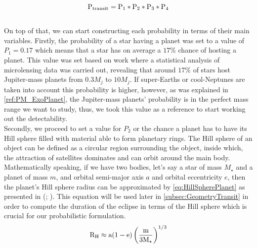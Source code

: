 \begingroup
\Large
\begin{equation}
 \textnormal{P}_{\textnormal{transit}} = \textnormal{P}_1 * \textnormal{P}_2 * \textnormal{P}_3 * \textnormal{P}_4
 \label{eq:Probabilities}
\end{equation}
\endgroup\\

On top of that, we can start constructing each probability in terms of their main variables. Firstly, the probability of a star having a planet was set to a value of $P_1 = 0.17$ which means that a star has on average a $17\%$ chance of hosting a planet. This value was set based on \citeyear{2012Natur.481..167C} work where a statistical analysis of microlensing data was carried out, revealing that around $17\%$ of stars host Jupiter-mass planets from $0.3M_j$ to $10M_j$. If super-Earths or cool-Neptunes are taken into account this probability is higher, however, as was explained in \autoref{ref:PM_ExoPlanet}, the Jupiter-mass planets' probability is in the perfect mass range we want to study, thus, we took this value as a reference to start working out the detectability.\\

Secondly, we proceed to set a value for $P_2$ or the chance a planet has to have its Hill sphere filled with material able to form planetary rings. The Hill sphere of an object can be defined as a circular region surrounding the object, inside which, the attraction of satellites dominates and can orbit around the main body. Mathematically speaking, if we have two bodies, let's say a star of mass $M_\star$ and a planet of mass $m$, and orbital semi-major axis $a$ and orbital eccentricity $e$, then the planet's Hill sphere radius can be approximated by \autoref{eq:HillSpherePlanet} as presented in (\citeyear{2017MNRAS.471..740O}; \citeyear{2016A&A...596A...9R}). This equation will be used later in \autoref{subsec:GeometryTransit} in order to compute the duration of the eclipse in terms of the Hill sphere which is crucial for our probabilistic formulation.\\ 

\begingroup
\Large
\begin{equation}
\textnormal{R}_\textnormal{H} \approx \textnormal{a}(1 - \textnormal{e}) \left(\frac{\textnormal{m}}{3\textnormal{M}_\star} \right)^{1/3}
 \label{eq:HillSpherePlanet}
\end{equation}
\endgroup\\

